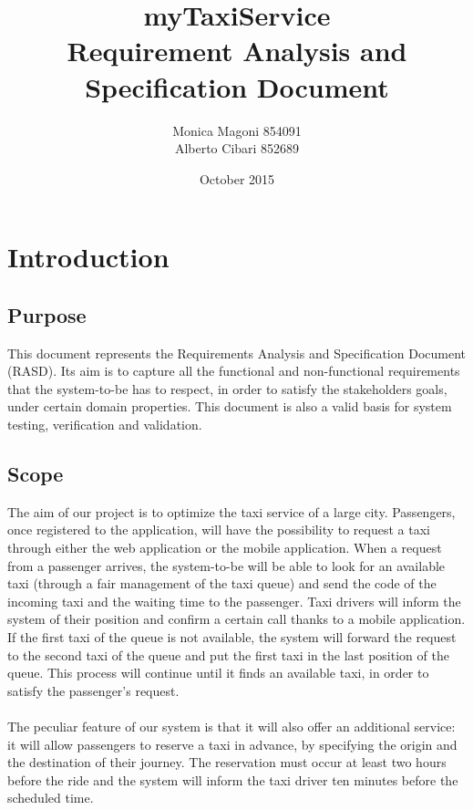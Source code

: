 \documentclass{article}
\title{
	\textbf{\Huge{myTaxiService}}
	\\ 
	\huge{Requirement Analysis and Specification Document}
}
\author{
	Monica Magoni 854091\\Alberto Cibari 852689
}
\date{October 2015}
\begin{document}
	
	\begin{comment}
	Pagina Titolo
	\end{comment}
	\maketitle
	
	
	\begin{comment}
	Pagina Indici
	\end{comment}
	\newpage
	\renewcommand*\contentsname{\Huge{Summary}}
	\tableofcontents
	
	
	\begin{comment}
	Pagine Testo 
	\end{comment}
	\newpage
	\section{Introduction}
	
	\subsection{Purpose}
	This document represents the Requirements Analysis and Specification Document (RASD).
	Its aim is to capture all the functional and non-functional requirements that the system-to-be has to respect, in order to satisfy the stakeholders goals, under certain domain properties. This document is also a valid basis for system testing, verification and validation.
	
	\subsection{Scope}
	The aim of our project is to optimize the taxi service of a large city. 
	Passengers, once registered to the application, will have the possibility to request a taxi through either the web application or the mobile application. When a request from a passenger arrives, the system-to-be will be able to look for an available taxi (through a fair management of the taxi queue) and send the code of the incoming taxi and the waiting time to the passenger. Taxi drivers will inform the system of their position and confirm a certain call thanks to a mobile application.\\
	If the first taxi of the queue is not available, the system will forward the request to the second taxi of the queue and put the first taxi in the last position of the queue. This process will continue until it finds an available taxi, in order to satisfy the passenger's request.\\\\
	The peculiar feature of our system is that it will also offer an additional service: it will allow passengers to reserve a taxi in advance, by specifying the origin and the destination of their journey. The reservation must occur at least two hours before the ride and the system will inform the taxi driver ten minutes before the scheduled time.
	
\end{document}
